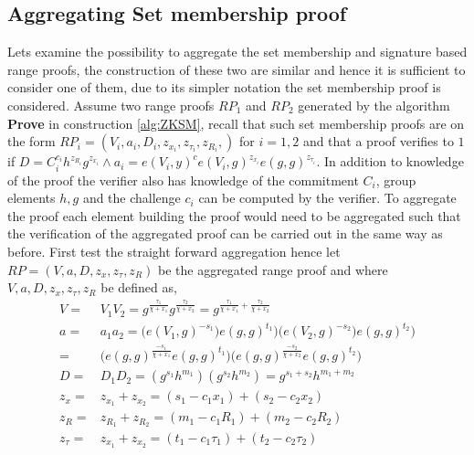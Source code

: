 \subsection*{Aggregating Set membership proof}
Lets examine the possibility to aggregate the set membership and signature based range proofs, the construction of these two are similar and hence it is sufficient to consider one of them, due to  its simpler notation the set membership proof is considered. Assume two range proofs $RP_1$ and $RP_2$ generated by the algorithm \textbf{Prove} in construction \ref{alg:ZKSM}, recall that such set membership proofs are on the form $RP_i = (V_i,a_i,D_i,z_{x_i},z_{\tau _i},z_{R_i}, )$ for $i=1,2$ and that a proof verifies to $1$ if  $D=C_i^{c_i}h^{z_{R_i}}g^{z_{x_i}}\wedge a_i = e(V_i,y)^ce(V_i,g)^{z_{x_i}}e(g,g)^{z_{\tau_i}}$. In addition to knowledge of the proof the verifier also has knowledge of the commitment $C_i$,  group elements $h,g$  and the challenge $c_i$ can be computed by the verifier. To aggregate the proof each element building the proof would need to be aggregated such that the verification of the aggregated proof can be carried out in the same way as before. First test the straight forward aggregation hence let $RP = (V,a,D,z_{x},z_{\tau },z_{R})$ be the aggregated range proof and  where $V, a, D,z_{x},z_{\tau },z_{R}$ be defined as,
\begin{equation}
\begin{aligned}
\label{eq:naiveAgg}
V =& V_1V_2 = g^{\frac{\tau_1}{\chi + x_1}}g^{\frac{\tau_2}{\chi + x_2}}  = g^{\frac{\tau_1}{\chi + x_1} + \frac{\tau_2}{\chi + x_2}}  \\
a =& a_1a_2 = \big(e(V_1,g)^{-s_1})e(g,g)^{t_1}\big)  \big(e(V_2,g)^{-s_2})e(g,g)^{t_2}\big) \\
=&  \big( e(g,g)^{\frac{-s_1}{\chi+x_1}}e(g,g)^{t_1}\big) \big( e(g,g)^{\frac{-s_2}{\chi+x_2}}e(g,g)^{t_2}\big) \\
D =& D_1D_2 = ( g^{s_1}h^{m_1} ) (g^{s_2} h^{m_2}) = g^{s_1+s_2}h^{m_1+m_2}\\
z_x =& z_{x_1} + z_{x_2} = (s_1-c_1x_1)+(s_2-c_2x_2)\\
z_R =& z_{R_1} + z_{R_2} = (m_1-c_1R_1)+(m_2-c_2R_2)\\
z_\tau =& z_{x_1} + z_{x_2} = (t_1-c_1\tau_1)+(t_2-c_2\tau_2)\\ 
\end{aligned} 
\end{equation}
